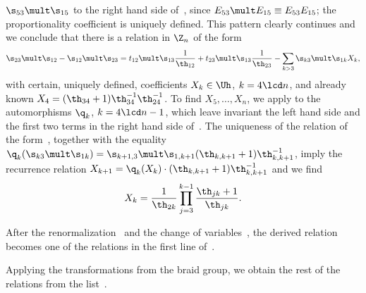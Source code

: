 $\s_{53}\mult\s_{15}$ to the right hand side of~, since $E_{53}\mult E_{15}\equiv E_{53}E_{15}$;
the proportionality coef\/f\/icient is uniquely def\/ined.
This pattern clearly continues and we conclude that there is a relation in $\Z_n$ of the form
\begin{gather}\label{proof13}
\s_{23}\mult\s_{12}-\s_{12}\mult\s_{23}=t_{12}\mult\s_{13} \frac{1}{\th_{12}}+t_{23}\mult\s_{13}\frac{1}{\th_{23}}-
\sum_{k>3}\s_{k3}\mult\s_{1k}X_k  ,
\end{gather}
with certain, uniquely def\/ined, coef\/f\/icients $X_k\in\Uh$, $k=4\lcd n$, and already known $X_4=(\th_{34}+1)
{\th_{34}^{-1}\th_{24}^{-1}}$. To f\/ind $X_5,\dots ,X_n$, we apply to  the
automorphisms $\q_k$, $k=4\lcd n-1$, which leave invariant the left hand side and the f\/irst two terms in the
right hand side of~. The uniqueness of the relation of the form~, together with the equality
$\q_k(\s_{k3}\mult\s_{1k})=\s_{k+1,3}\mult\s_{1,k+1}(\th_{k,k+1}+1)\th_{k,k+1}^{-1}$, imply the recurrence relation
$X_{k+1}=\q_k(X_k)\cdot(\th_{k,k+1}+1)\th_{k,k+1}^{-1}$ and we f\/ind
\begin{gather*}%
X_k=\frac{1}{\th_{2k}}\prod_{j=3}^{k-1}\frac{\th_{jk}+1}{\th_{jk}}  .
\end{gather*}

After the renormalization~ and the change of variables~, the derived relation becomes one of the
relations in the f\/irst line of~.


Applying the transformations from the braid group, we obtain the rest of the relations from the list~.

